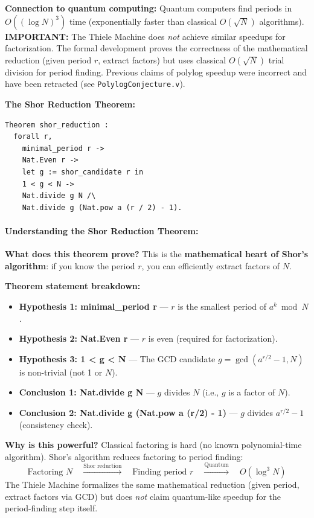 \textbf{Connection to quantum computing:} Quantum computers find periods in $O((\log N)^3)$ time (exponentially faster than classical $O(\sqrt{N})$ algorithms). \textbf{IMPORTANT:} The Thiele Machine does \textit{not} achieve similar speedups for factorization. The formal development proves the correctness of the mathematical reduction (given period $r$, extract factors) but uses classical $O(\sqrt{N})$ trial division for period finding. Previous claims of polylog speedup were incorrect and have been retracted (see \texttt{PolylogConjecture.v}).


\textbf{The Shor Reduction Theorem:}
\begin{lstlisting}
Theorem shor_reduction :
  forall r,
    minimal_period r ->
    Nat.Even r ->
    let g := shor_candidate r in
    1 < g < N ->
    Nat.divide g N /\ 
    Nat.divide g (Nat.pow a (r / 2) - 1).
\end{lstlisting}

\paragraph{Understanding the Shor Reduction Theorem:}

\textbf{What does this theorem prove?} This is the \textbf{mathematical heart of Shor's algorithm}: if you know the period $r$, you can efficiently extract factors of $N$.

\textbf{Theorem statement breakdown:}
\begin{itemize}
    \item \textbf{Hypothesis 1: minimal\_period r} — $r$ is the smallest period of $a^k \bmod N$.
    
    \item \textbf{Hypothesis 2: Nat.Even r} — $r$ is even (required for factorization).
    
    \item \textbf{Hypothesis 3: 1 < g < N} — The GCD candidate $g = \gcd(a^{r/2} - 1, N)$ is non-trivial (not 1 or $N$).
    
    \item \textbf{Conclusion 1: Nat.divide g N} — $g$ divides $N$ (i.e., $g$ is a factor of $N$).
    
    \item \textbf{Conclusion 2: Nat.divide g (Nat.pow a (r/2) - 1)} — $g$ divides $a^{r/2} - 1$ (consistency check).
\end{itemize}

\textbf{Why is this powerful?} Classical factoring is hard (no known polynomial-time algorithm). Shor's algorithm reduces factoring to period finding:
\[
\text{Factoring } N \quad \xrightarrow{\text{Shor reduction}} \quad \text{Finding period } r \quad \xrightarrow{\text{Quantum}} \quad O(\log^3 N)
\]
The Thiele Machine formalizes the same mathematical reduction (given period, extract factors via GCD) but does \textit{not} claim quantum-like speedup for the period-finding step itself.


